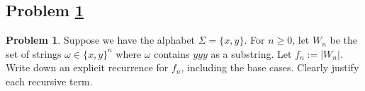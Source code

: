 \documentclass[11pt]{article}
\theoremstyle{definition}
\theoremstyle{definition}
\newtheorem{required}{Problem}
\theoremstyle{definition}
\begin{document}

\newpage
\subsection{Problem \ref{DP4}}

\begin{required} \label{DP4}
Suppose we have the alphabet $\Sigma = \{x, y\}$. For $n \geq 0$, let $W_{n}$ be the set of strings $\omega \in \{x, y\}^{n}$ where $\omega$ contains $yyy$ as a substring. Let $f_{n} := |W_{n}|$. Write down an explicit recurrence for $f_{n}$, including the base cases. Clearly justify each recursive term.
\end{required}
\end{document}
